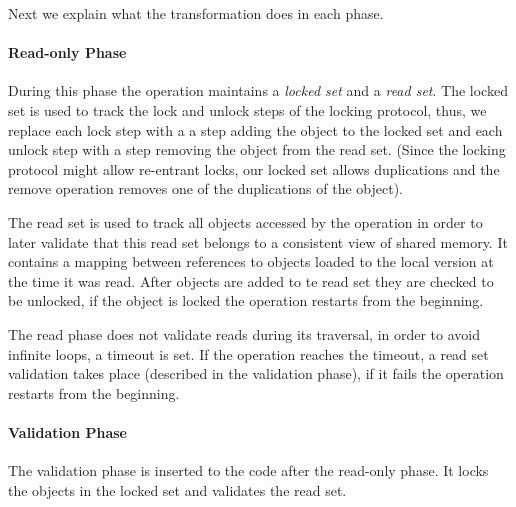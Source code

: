 Next we explain what the transformation does in each phase. 

\paragraph{Read-only Phase} 
  During this phase the operation maintains a \emph{locked set}
  and a \emph{read set}. 
  The locked set is used to track the lock and unlock steps
  of the locking protocol, thus, we replace each lock step 
  with a a step adding the object to the locked set and each
  unlock step with a step removing the object from the read
  set. (Since the locking protocol might allow re-entrant locks, 
  our locked set allows duplications and the remove operation
  removes one of the duplications of the object).  
  
The read set is used to track all objects accessed by the 
operation in order to later validate that this read set
belongs to a consistent view of shared memory.  
It contains a mapping between references to objects loaded 
to the local version at the time it was read. After 
objects are added to te read set they are checked to be 
unlocked, if the object is locked the operation restarts
from the beginning. 


 
The read phase does not validate reads during its traversal, 
in order to avoid infinite loops, a timeout is set. 
If the operation reaches the timeout, a read set 
validation takes place (described in the validation phase), 
if it fails the operation restarts from the beginning.
  

\paragraph{Validation Phase} 
The validation phase is inserted to the code after
the read-only phase. It locks the objects in the locked set
and validates the read set. 

